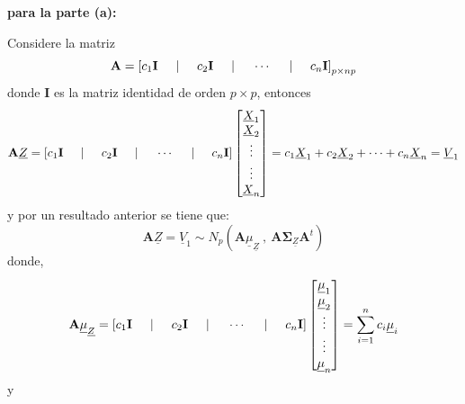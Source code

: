 \documentclass[
]{book}
\theoremstyle{definition}
\theoremstyle{definition}
\theoremstyle{definition}
\theoremstyle{definition}
\theoremstyle{remark}
\begin{document}
\textbf{para la parte (a):}

Considere la matriz
\[
\mathbf{A}=\left[c_1\mathbf{I} \hspace{0.5cm}| \hspace{0.5cm} c_2\mathbf{I}  \hspace{0.5cm}| \hspace{0.5cm} \cdots  \hspace{0.5cm}| \hspace{0.5cm} c_n\mathbf{I} \right]_{p\times np}
\]
donde \(\mathbf{I}\) es la matriz
identidad de orden \(p\times p\), entonces
\[
 \mathbf{A}\underline{Z}=\left[c_1\mathbf{I} \hspace{0.5cm}| \hspace{0.5cm} c_2\mathbf{I}  \hspace{0.5cm}| \hspace{0.5cm} \cdots  \hspace{0.5cm}| \hspace{0.5cm} c_n\mathbf{I} \right]\begin{bmatrix}
\underline{X}_1 \\ \underline{X}_2
\\ \vdots \\ \vdots \\ \underline{X}_n
\end{bmatrix}=c_1\underline{X}_1+c_2\underline{X}_2+\cdots+c_n \underline{X}_n=\underline{V}_1
\]
y por un resultado anterior se tiene que:
\[
 \mathbf{A}\underline{Z}= \underline{V}_1 \sim N_p \left( \mathbf{A} \underline{\mu}_{\underline{Z}} \ , \ \mathbf{A} \mathbf{\Sigma}_{\underline{Z}} \mathbf{A}^t \right)
\]
donde,
\[
\mathbf{A} \underline{\mu}_{\underline{Z}}=\left[c_1\mathbf{I} \hspace{0.5cm}| \hspace{0.5cm} c_2\mathbf{I}  \hspace{0.5cm}| \hspace{0.5cm} \cdots  \hspace{0.5cm}| \hspace{0.5cm} c_n\mathbf{I} \right]\begin{bmatrix}
\underline{\mu}_1 \\ \underline{\mu}_2
\\ \vdots \\ \vdots \\ \underline{\mu}_n
\end{bmatrix}=\sum_{i=1}^n c_i \underline{\mu}_i
\]
y
\end{document}
